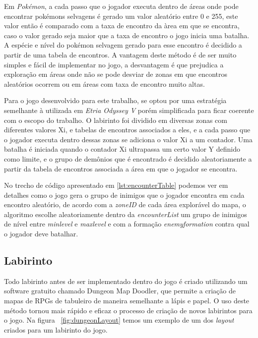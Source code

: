 Em \emph{Pokémon}, a cada passo que o jogador executa dentro de áreas onde pode encontrar pokémons selvagens é gerado um valor aleatório entre 0 e 255, este valor então é comparado com a taxa de encontro da àrea em que se encontra, caso o valor gerado seja maior que a taxa de encontro o jogo inicia uma batalha. A espécie e nível do pokémon selvagem gerado para esse encontro é decidido a partir de uma tabela de encontros. A vantagem deste método é de ser muito simples e fácil de implementar no jogo, a desvantagem é que prejudica a exploração em áreas onde não se pode desviar de zonas em que encontros aleatórios ocorrem ou em áreas com taxa de encontro muito altas.

Para o jogo desenvolvido para este trabalho, se optou por uma estratégia semelhante à utilizada em \emph{Etria Odyssey V} porém simplificada para ficar coerente com o escopo do trabalho. O labirinto foi dividido em diversas zonas com diferentes valores Xi, e tabelas de encontros associados a eles, e a cada passo que o jogador executa dentro dessas zonas se adiciona o valor Xi a um contador. Uma batalha é iniciada quando o contador Xi ultrapassa um certo valor Y definido como limite, e o grupo de demônios que é encontrado é decidido aleatoriamente a partir da tabela de encontros associada a área em que o jogador se encontra.
\pagebreak


No trecho de código apresentado em \ref{lst:encounterTable} podemos ver em detalhes como o jogo gera o grupo de inimigos que o jogador encontra em cada encontro aleatório, de acordo com a \emph{zoneID} de cada área explorável do mapa, o algoritmo escolhe aleatoriamente dentro da \emph{encounterList} um grupo de inimigos de nível entre \emph{min\textunderscore level} e \emph{max\textunderscore level} e com a formação \emph{enemy\textunderscore formation} contra qual o jogador deve batalhar.

\subsection{Labirinto}

	Todo labirinto antes de ser implementado dentro do jogo é criado utilizando um software gratuito chamado Dungeon Map Doodler, que permite a criação de mapas de RPGs de tabuleiro de maneira semelhante a lápis e papel. O uso deste método tornou mais rápido e eficaz o processo de criação de novos labirintos para o jogo. Na figura ~\ref{fig:dungeonLayout} temos um exemplo de um dos \emph{layout} criados para um labirinto do jogo.
	
